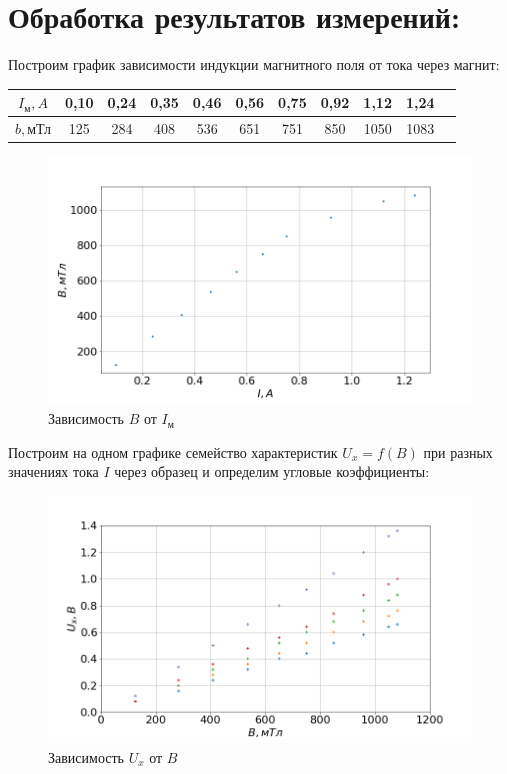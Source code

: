 \documentclass[a4paper, fontsize=14pt]{article}
\begin{document}
\section*{Обработка результатов измерений:}
Построим график зависимости индукции магнитного поля от тока через магнит:
\begin{table}[H]

	\centering
	\begin{tabular}{|c|c|c|c|c|c|c|c|c|c|c|} \hline
		$I_\text{м}, A$ & 0,10 & 0,24 & 0,35 & 0,46 & 0,56 & 0,75 & 0,92 & 1,12 & 1,24 \\\hline
		$b, \text{мТл}$ & 125 & 284 & 408 & 536 & 651 & 751 & 850 & 1050 & 1083 \\\hline
	\end{tabular}	
\end{table}
\begin{figure}[H]
\center
\includegraphics[scale=0.4]{1.png}
\caption{Зависимость $B$ от $I_\text{м}$}
\end{figure}
Построим на одном графике семейство характеристик $U_x = f(B)$ при разных значениях тока $I$ через образец и определим угловые коэффициенты:
\begin{figure}[H]
\center
\includegraphics[scale=0.4]{2.png}
\caption{Зависимость $U_x$ от $B$}
\end{figure}
\end{document}
